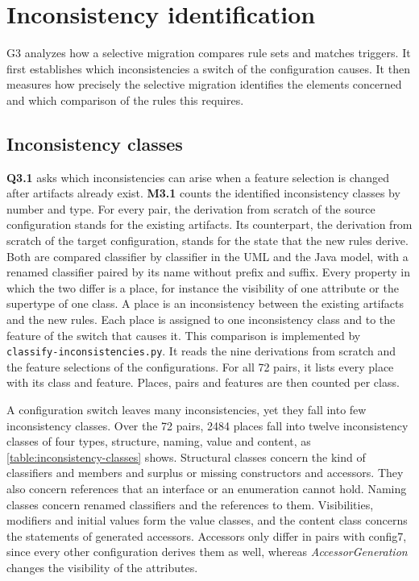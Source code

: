 \section{Inconsistency identification}
\label{sec:Evaluation:InconsistencyIdentification}

G3 analyzes how a selective migration compares rule sets and matches triggers.
It first establishes which inconsistencies a switch of the configuration causes.
It then measures how precisely the selective migration identifies the elements concerned and which comparison of the rules this requires.

\subsection{Inconsistency classes}
\label{sec:Evaluation:InconsistencyIdentification:InconsistencyClasses}

\textbf{Q3.1} asks which inconsistencies can arise when a feature selection is changed after artifacts already exist.
\textbf{M3.1} counts the identified inconsistency classes by number and type.
For every pair, the derivation from scratch of the source configuration stands for the existing artifacts.
Its counterpart, the derivation from scratch of the target configuration, stands for the state that the new rules derive.
Both are compared classifier by classifier in the UML and the Java model, with a renamed classifier paired by its name without prefix and suffix.
Every property in which the two differ is a place, for instance the visibility of one attribute or the supertype of one class.
A place is an inconsistency between the existing artifacts and the new rules.
Each place is assigned to one inconsistency class and to the feature of the switch that causes it.
This comparison is implemented by \texttt{classify-inconsistencies.py}.
It reads the nine derivations from scratch and the feature selections of the configurations.
For all 72 pairs, it lists every place with its class and feature.
Places, pairs and features are then counted per class.

A configuration switch leaves many inconsistencies, yet they fall into few inconsistency classes.
Over the 72 pairs, 2484 places fall into twelve inconsistency classes of four types, structure, naming, value and content, as \autoref{table:inconsistency-classes} shows.
Structural classes concern the kind of classifiers and members and surplus or missing constructors and accessors.
They also concern references that an interface or an enumeration cannot hold.
Naming classes concern renamed classifiers and the references to them.
Visibilities, modifiers and initial values form the value classes, and the content class concerns the statements of generated accessors.
Accessors only differ in pairs with config7, since every other configuration derives them as well, whereas \textit{AccessorGeneration} changes the visibility of the attributes.

